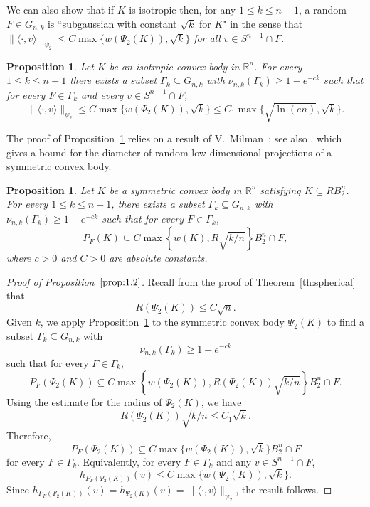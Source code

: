\documentclass[11pt,leqno]{article}
\newtheorem{proposition}[theorem]{Proposition}
\theoremstyle{definition}
\numberwithin{equation}{section}
\newcommand{\ls}{\leqslant}
\newcommand{\gr}{\geqslant}
\begin{document}
We can also show that if $K$ is isotropic then, for any $1\ls k\ls n-1$, a random $F\in G_{n,k}$ is ``subgaussian with constant $\sqrt{k}$ for $K$" in the sense
that $\|\langle\cdot ,v\rangle\|_{\psi_2}\ls C\max\{w(\Psi_2(K)),\sqrt{k}\}$ {\it for all} $v\in S^{n-1}\cap F$. 

\begin{proposition}\label{prop:1.2}Let $K$ be an isotropic convex body in $\mathbb{R}^n$. For every $1\ls k\ls n-1$ there exists a subset $\Gamma_k\subseteq G_{n,k}$ with
$\nu_{n,k}(\Gamma_k)\gr 1-e^{-ck}$ such that for every $F\in\Gamma_k$ and every $v\in S^{n-1}\cap F$,
\[\|\langle\cdot ,v\rangle\|_{\psi_2}\ls C\max\{w(\Psi_2(K)),\sqrt{k}\}\ls C_1\max\{\sqrt{\ln(en)},\sqrt{k}\}.\]
\end{proposition}

The proof of Proposition~\ref{prop:1.2} relies on a result of V.~Milman~\cite{VMilman-1990}; see also
\cite[Proposition~5.7.1]{AGA-book}, which gives a bound for the diameter of
random low-dimensional projections of a symmetric convex body.

\begin{proposition}\label{prop:diam-rdm-proj}
Let $K$ be a symmetric convex body in $\mathbb{R}^n$ satisfying $K\subseteq RB_2^n$.
For every $1\ls k\ls n-1$, there exists a subset $\Gamma_k\subseteq G_{n,k}$ with $\nu_{n,k}(\Gamma_k)\gr 1-e^{-ck}$
such that for every $F\in\Gamma_k$,
\[P_F(K)\subseteq C\max\left\{w(K),R\sqrt{k/n}\right\}B_2^n\cap F ,\]
where $c>0$ and $C>0$ are absolute constants.
\end{proposition}

\begin{proof}[Proof of Proposition~$\ref{prop:1.2}$]
Recall from the proof of Theorem~\ref{th:spherical} that
\[R(\Psi_2(K)) \ls C\sqrt n.\] 
Given $k$, we apply Proposition~\ref{prop:diam-rdm-proj} to the symmetric convex body
$\Psi_2(K)$ to find a subset $\Gamma_k\subseteq G_{n,k}$ with
\[\nu_{n,k}(\Gamma_k)\gr 1-e^{-ck}\]
such that for every $F\in\Gamma_k$,
\[P_F(\Psi_2(K))\subseteq C\max\left\{w(\Psi_2(K)),R(\Psi_2(K))\sqrt{k/n}\right\}B_2^n\cap F .\]
Using the estimate for the radius of $\Psi_2(K)$, we have
\[R(\Psi_2(K))\sqrt{k/n}\ls C_1\sqrt{k}.\]
Therefore,
\[P_F(\Psi_2(K))\subseteq C\max\{w(\Psi_2(K)),\sqrt{k}\}B_2^n\cap F\]
for every $F\in\Gamma_k$. Equivalently, for every $F\in\Gamma_k$ and any $v\in S^{n-1}\cap F$,
\[h_{P_F(\Psi_2(K))}(v)\ls C\max\{w(\Psi_2(K)),\sqrt{k}\}.\]
Since $h_{P_F(\Psi_2(K))}(v)=h_{\Psi_2(K)}(v)=\|\langle\cdot ,v\rangle\|_{\psi_2}$, the result follows.
\end{proof}
\end{document}
